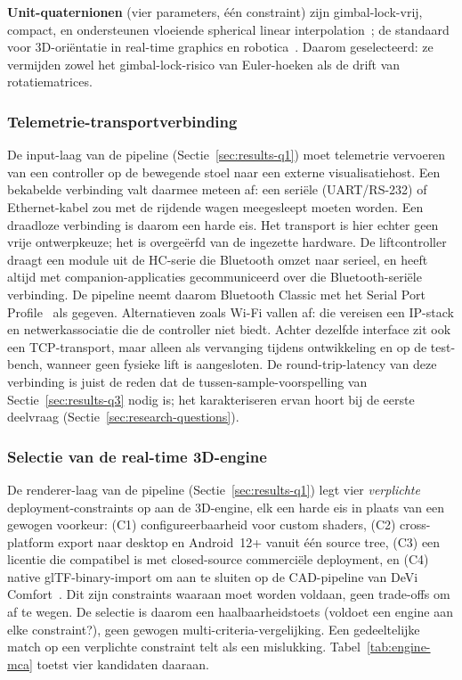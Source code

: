 \documentclass[10pt, a4paper, twocolumn]{article}
\begin{document}
\textbf{Unit-quaternionen} (vier parameters, één constraint) zijn
gimbal-lock-vrij, compact, en ondersteunen vloeiende spherical linear
interpolation~\cite{shoemake1985quaternion}; de standaard voor 3D-oriëntatie in
real-time graphics en robotica~\cite{kuipers1999quaternions, diebel2006attitude}.
Daarom geselecteerd: ze vermijden zowel het gimbal-lock-risico van Euler-hoeken
als de drift van rotatiematrices.

\subsubsection{Telemetrie-transportverbinding}
\label{sec:prior-transport}
De input-laag van de pipeline (Sectie~\ref{sec:results-q1}) moet telemetrie
vervoeren van een controller op de bewegende stoel naar een externe
visualisatiehost. Een bekabelde verbinding valt daarmee meteen af: een seriële
(UART/RS-232) of Ethernet-kabel zou met de rijdende wagen meegesleept moeten
worden. Een draadloze verbinding is daarom een harde eis. Het
transport is hier echter geen vrije ontwerpkeuze; het is overgeërfd van de
ingezette hardware. De liftcontroller draagt een module uit de HC-serie die Bluetooth omzet naar
serieel, en heeft altijd met companion-applicaties
gecommuniceerd over die Bluetooth-seriële verbinding. De pipeline neemt daarom
Bluetooth Classic met het Serial Port Profile~\cite{bluetoothsig2022spp} als
gegeven. Alternatieven zoals Wi-Fi vallen af: die vereisen een IP-stack en
netwerkassociatie die de controller niet biedt. Achter dezelfde interface zit
ook een TCP-transport, maar alleen als vervanging tijdens ontwikkeling en op de
test-bench, wanneer geen fysieke lift is aangesloten. De round-trip-latency van
deze verbinding is juist de reden dat de tussen-sample-voorspelling van
Sectie~\ref{sec:results-q3} nodig is; het karakteriseren ervan hoort bij de
eerste deelvraag (Sectie~\ref{sec:research-questions}).

\subsubsection{Selectie van de real-time 3D-engine}
\label{sec:prior-engine}
De renderer-laag van de pipeline (Sectie~\ref{sec:results-q1}) legt vier
\emph{verplichte} deployment-constraints op aan de 3D-engine, elk een harde eis
in plaats van een gewogen voorkeur: (C1) configureerbaarheid voor custom
shaders, (C2) cross-platform export naar desktop en Android~12+ vanuit één
source tree, (C3) een licentie die compatibel is met closed-source commerciële
deployment, en (C4) native glTF-binary-import om aan te sluiten op de
CAD-pipeline van DeVi Comfort~\cite{khronos2021gltf}. Dit zijn constraints waaraan moet worden voldaan, geen trade-offs om af te
wegen. De selectie is daarom een haalbaarheidstoets (voldoet een engine aan elke
constraint?), geen gewogen multi-criteria-vergelijking. Een gedeeltelijke match op een verplichte
constraint telt als een mislukking. Tabel~\ref{tab:engine-mca} toetst vier
kandidaten daaraan.
\end{document}

